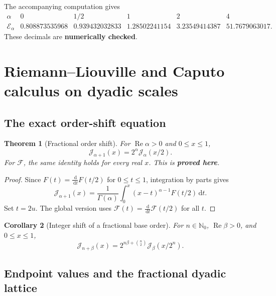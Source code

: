 \documentclass[11pt]{article}
\newcommand{\statusproved}{\textcolor{statusgreen}{\textbf{proved here}}}
\newcommand{\statusnumeric}{\textcolor{statusorange}{\textbf{numerically checked}}}
\newtheorem{theorem}{Theorem}[section]
\newtheorem{corollary}[theorem]{Corollary}
\theoremstyle{definition}
\theoremstyle{remark}
\newcommand{\N}{\mathbb N}
\newcommand{\dd}{\,\mathrm d}
\newcommand{\Ree}{\operatorname{Re}}
\newcommand{\extF}{\mathcal F}
\newcommand{\J}{\mathcal J}
\begin{document}
The accompanying computation gives
\begin{equation}
\begin{array}{c|ccccc}
 \alpha&0&1/2&1&2&4\\ \hline
 \mathcal E_\alpha
 &0.808873535968&0.939432032833&1.28502241154&3.23549414387&51.7679063017.
\end{array}
\label{eq:energy-numerics}
\end{equation}
These decimals are \statusnumeric.

\section{Riemann--Liouville and Caputo calculus on dyadic scales}
\label{sec:fractional}

\subsection{The exact order-shift equation}

\begin{theorem}[Fractional order shift]
\label{thm:fractional-shift}
For $\Ree\alpha>0$ and $0\le x\le1$,
\begin{equation}
 \boxed{\J_{\alpha+1}(x)=2^\alpha\J_\alpha(x/2).}
 \label{eq:fractional-shift}
\end{equation}
For $\extF$, the same identity holds for every real $x$.  This is \statusproved.
\end{theorem}

\begin{proof}
Since $F(t)=\frac{\dd}{\dd t}F(t/2)$ for $0\le t\le1$, integration by parts gives
\[
 \J_{\alpha+1}(x)
 =\frac1{\Gamma(\alpha)}\int_0^x(x-t)^{\alpha-1}F(t/2)\dd t.
\]
Set $t=2u$.  The global version uses
$\extF(t)=\frac{\dd}{\dd t}\extF(t/2)$ for all $t$.
\end{proof}

\begin{corollary}[Integer shift of a fractional base order]
\label{cor:fractional-integer-shift}
For $n\in\N_0$, $\Ree\beta>0$, and $0\le x\le1$,
\begin{equation}
 \J_{n+\beta}(x)
 =2^{n\beta+\binom n2}\J_\beta(x/2^n).
 \label{eq:fractional-integer-shift}
\end{equation}
\end{corollary}

\subsection{Endpoint values and the fractional dyadic lattice}
\end{document}
